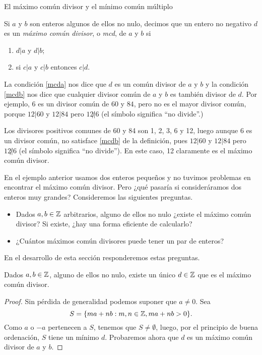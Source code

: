 \begin{section}{El máximo común divisor y el mínimo común múltiplo}\label{seccion-maximo-comun-divisor-mcm}

\begin{definicion}\label{mcd} Si $a$ y $b$ son enteros algunos de ellos no nulo, decimos que un entero no negativo $d$ es un \textit{máximo común divisor}, o \textit{mcd}, de $a$ y $b$ si
\begin{enumerate}[label=\textit{\alph*)}]
\item\label{mcda} $ d|a$  y $d|b$;
\item\label{mcdb}  si $ c|a $ y $c|b$ entonces $ c|d$.
\end{enumerate}
\end{definicion}
La condición \ref{mcda} nos dice que $d$ es un común divisor de $a$ y $b$ y la condición \ref{mcdb} nos dice que cualquier divisor común de
$a$ y $b$ es también divisor de $d$. Por ejemplo, $6$ es un divisor común de $60$ y $84$, pero no es el mayor divisor común, porque
$12|60$ y $12|84$ pero $12{\not|}6$ (el símbolo significa ``no divide''.)



\begin{ejemplo} \label{ejem-1-mcd}
    Los divisores positivos comunes de 60  y 84 son 1, 2, 3, 6 y 12, luego aunque 6  es un divisor común, no satisface \ref{mcdb} de la definición, pues $12|60$ y $12|84$ pero $12{\not|}6$ (el símbolo significa ``no divide''). En este caso, 12  claramente es  el  máximo común divisor.
\end{ejemplo}

En el ejemplo anterior usamos dos enteros pequeños y no tuvimos problemas en encontrar el  máximo común divisor. Pero ¿qué pasaría si consideráramos dos enteros muy grandes? Consideremos las siguientes preguntas.
\begin{itemize}
    \item Dados $a,b \in {\mathbb Z}$ arbitrarios, alguno de ellos no nulo ¿existe el máximo común divisor? Si existe, ¿hay una forma eficiente de calcularlo?
    \item  ¿Cuántos máximos común divisores puede tener un  par de enteros?
\end{itemize}
En  el desarrollo de esta sección responderemos estas preguntas. 


\begin{teorema}
    Dados $a,b \in {\mathbb Z}$, alguno de ellos no nulo, existe un único $d \in {\mathbb Z}$ que es el máximo común divisor. 
\end{teorema}
\begin{proof}
    Sin pérdida de generalidad podemos suponer que  $a \ne 0$. Sea 
    \begin{equation*}
    S = \{m a+n b : m,n\in {\mathbb Z}, m a+n b>0\}.
    \end{equation*}
    Como  $a$ o $-a$ pertenecen a $S$, tenemos que  $S \not= \emptyset$, luego, por el principio de buena ordenación, $S$ tiene un  mínimo $d$. Probaremos ahora que  $d$  es un  máximo común divisor de $a$ y $b$. 
    

\end{proof}
\end{section}
